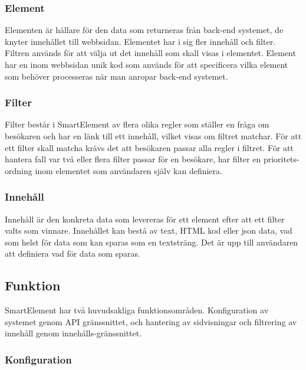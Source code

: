 \subsubsection{Element}

Elementen är hållare för den data som returneras från back-end systemet, de knyter innehållet till webbsidan. Elementet har i sig fler innehåll och filter. Filtren används för att välja ut det innehåll som skall visas i elementet. Element har en inom webbsidan unik kod som används för att specificera vilka element som behöver processeras när man anropar back-end systemet.

\subsubsection{Filter}

Filter består i SmartElement av flera olika regler som ställer en fråga om besökaren och har en länk till ett innehåll, vilket visas om filtret matchar. För att ett filter skall matcha krävs det att besökaren passar alla regler i filtret. För att hantera fall var två eller flera filter passar för en besökare, har filter en prioritets-ordning inom elementet som användaren själv kan definiera.

\subsubsection{Innehåll}

Innehåll är den konkreta data som levereras för ett element efter att ett filter valts som vinnare. Innehållet kan bestå av text, HTML kod eller \gls{json} data, vad som helst för data som kan sparas som en textsträng. Det är upp till användaren att definiera vad för data som sparas.

\subsection{Funktion}

SmartElement har två huvudsakliga funktionsområden. Konfiguration av systemet genom API gränssnittet, och hantering av sidvisningar och filtrering av innehåll genom innehålls-gränssnittet.

\subsubsection{Konfiguration}


